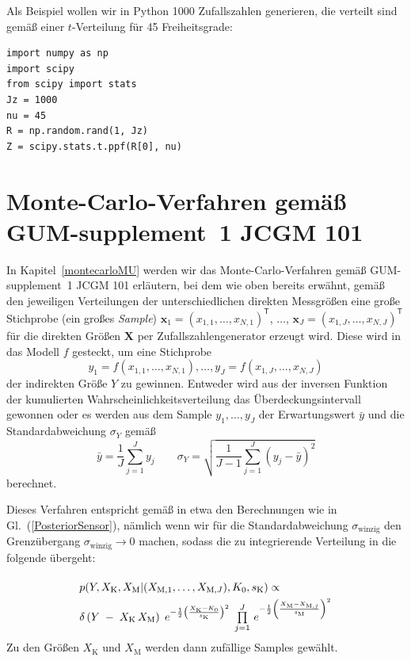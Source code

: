 Als Beispiel wollen wir in Python 1000 Zufalls\-zahlen generieren,
die verteilt sind gemäß einer $t$-Verteilung für 45 Freiheitsgrade:
\begin{lstlisting}[style=Python]
import numpy as np
import scipy
from scipy import stats
Jz = 1000
nu = 45
R = np.random.rand(1, Jz)
Z = scipy.stats.t.ppf(R[0], nu)
\end{lstlisting}

\section{Monte-Carlo-Verfahren gemäß GUM-supplement~1 JCGM 101}

In Kapitel~\ref{montecarloMU} werden wir das Monte-Carlo-Verfahren gemäß GUM-supplement~1 JCGM 101
erläutern, bei dem wie oben bereits erwähnt,
gemäß den jeweiligen Ver\-teil\-ungen der unterschiedlichen direkten Messgrößen
eine große Stichprobe (ein großes \textsl{Sample})
$\mathbf{x}_1 = (x_{1,1},\dots,x_{N,1})^\mathsf{T}$, $\dots$, $\mathbf{x}_J = (x_{1,J},\dots,x_{N,J})^\mathsf{T}$
für die direkten Größen $\mathbf{X}$ per Zufallszahlengenerator erzeugt
wird. Diese wird in das Modell $f$ gesteckt,
um eine Stichprobe
\begin{equation}
y_1 = f(x_{1,1},\dots,x_{N,1}), \dots, y_J = f(x_{1,J},\dots,x_{N,J})
\end{equation}
der indirekten Größe $Y$ zu gewinnen. Entweder wird aus der inversen Funktion der kumulierten
Wahrscheinlichkeitsverteilung das Überdeckungsintervall gewonnen oder es werden aus dem Sample $y_1,\dots, y_J$
der Erwartungswert $\bar y$ und die Standardabweichung $\sigma_Y$ gemäß
$$
\bar y = \frac{1}{J} \sum_{j=1}^{J} y_j \qquad
\sigma_Y = \sqrt{\frac{1}{J-1} \sum_{j=1}^{J} (y_j - \bar y)^2}
$$
berechnet.

Dieses Verfahren entspricht gemäß \cite{Wue08} in etwa den Berechnungen wie
in Gl.~(\ref{PosteriorSensor}), nämlich wenn wir für die Standardabweichung $\sigma_\mathrm{winzig}$
den Grenzübergang $\sigma_\mathrm{winzig} \rightarrow 0$ machen, sodass die zu integrierende
Verteilung in die folgende übergeht:
\begin{equation}
\arraycolsep=2.0pt\def\arraystretch{2.0}
\begin{array}{l}
p(Y, X_\mathrm{K}, X_\mathrm{M} | (X_{\mathrm{M},1}, \dots, X_{\mathrm{M},J}), K_0, s_\mathrm{K}) \propto \\
\delta\left(Y \; - \; X_\mathrm{K} \, X_\mathrm{M}\right)
\;  e^{-\frac{1}{2} \left(\frac{X_\mathrm{K} - K_0}{s_\mathrm{K}} \right)^2} \; \prod\limits_{j=1}^J  \,
e^{-\frac{1}{2} \left(\frac{ X_\mathrm{M} - X_{\mathrm{M},j} }{s_\mathrm{M}} \right)^2}
\end{array}
\label{PosteriorFall4}
\end{equation}
Zu den Größen $X_\mathrm{K}$ und $X_\mathrm{M}$ werden dann zufällige
Samples gewählt.

